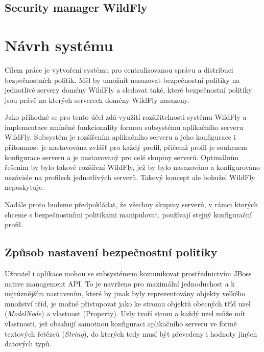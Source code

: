 \section{Security manager WildFly}








\chapter{Návrh systému}

Cílem práce je vytvoření systému pro centralizovanou správu a distribuci bezpečnostních politik. Měl by umožnit nasazovat bezpečnostní politiky na jednotlivé servery domény WildFly a sledovat také, které bezpečnostní politiky jsou právě na kterých serverech domény WildFly nasazeny.

Jako příhodné se pro tento účel zdá využití rozšiřitelnosti systému WildFly a implementace zmíněné funkcionality formou subsystému aplikačního serveru WildFly. Subsystém je rozšířením aplikačního serveru a jeho konfigurace i přítomnost je nastavována zvlášť pro každý profil, přičemž profil je souhrnem konfigurace serveru a je nastavovaný pro celé skupiny serverů. Optimálním řešením by bylo takové rozšíření WildFly, jež by bylo nasazováno a konfigurováno nezávisle na profilech jednotlivých serverů. Takový koncept ale bohužel WildFly neposkytuje.

Nadále proto budeme předpokládat, že všechny skupiny serverů, v rámci kterých chceme s bezpečnostními politikami manipulovat, používají stejný konfigurační profil.

\section{Způsob nastavení bezpečnostní politiky}

Uživatel i aplikace mohou se subsystémem komunikovat prostřednictvím JBoss native management API. To je navrženo pro maximální jednoduchost a k nejrůznějším nastavením, které by jinak byly reprezentovány objekty velkého množství tříd, je možné přistupovat jako ke stromu objektů obecných tříd uzel ({\it ModelNode}) a vlastnost (Property). Uzly tvoří strom a každý uzel může mít vlastnosti, jež obsahují samotnou konfiguraci aplikačního serveru ve formě textových řetězců ({\it String}), do kterých tedy musí být převedeny i hodnoty jiných datových typů. \cite{jbossDetypedManagement}

